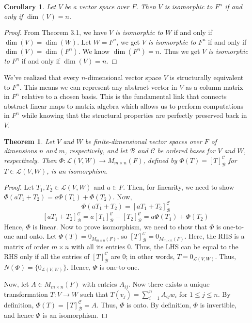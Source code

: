 \documentclass[12pt, a4paper]{article}
\newtheorem{theorem}{Theorem}[section]
\newtheorem{corollary}{Corollary}[theorem]
\theoremstyle{definition}
\theoremstyle{remark}
\newcommand{\B}{\mathscr{B}}
\begin{document}
\begin{corollary}
    Let $V$ be a vector space over $F$. Then $V$ \textit{is isomorphic to} $F^n$ if and only if $\dim(V) = n$.
\end{corollary}

\begin{proof}
    From Theorem 3.1, we have $V$ \textit{is isomorphic to} $W$ if and only if $\dim(V) = \dim(W)$. Let $W = F^n$, we get $V$ \textit{is isomorphic to} $F^n$ if and only if $\dim(V) = \dim(F^n)$. We know $\dim(F^n) = n$. Thus we get $V$ \textit{is isomorphic to} $F^n$ if and only if $\dim(V) = n$.
\end{proof}

We’ve realized that every $n$-dimensional vector space $V$ is structurally equivalent to $F^n$. This means we can represent any abstract vector in $V$ as a column matrix in $F^n$ relative to a chosen basis. This is the fundamental link that connects abstract linear maps to matrix algebra which allows us to perform computations in $F^n$ while knowing that the structural properties are perfectly preserved back in $V$.

\begin{theorem}
    Let $V$ and $W$ be finite-dimensional vector spaces over $F$ of dimensions $n$ and $m$, respectively, and let $\B$ and $\mathcal{C}$ be ordered bases for $V$ and $W$, respectively. Then $\Phi: \mathscr{L}(V, W) \to M_{m \times n}(F)$, defined by $\Phi(T) = [T]_\B^\mathscr{C}$ for $T \in \mathscr{L}(V, W)$, is an isomorphism.
\end{theorem}

\begin{proof}
    Let $T_1, T_2 \in \mathscr{L}(V, W)$ and $a \in F$. Then, for linearity, we need to show $\Phi(aT_1 + T_2) = a\Phi(T_1) + \Phi(T_2)$. Now,
\[ \Phi(aT_1 + T_2) = [aT_1 + T_2]_\B^\mathcal{C} \]
\[ [aT_1 + T_2]_\B^\mathcal{C} = a[T_1]_\B^\mathcal{C} + [T_2]_\B^\mathcal{C} = a\Phi(T_1) + \Phi(T_2) \]
Hence, $\Phi$ is linear. Now to prove isomorphism, we need to show that $\Phi$ is one-to-one and onto. Let $\Phi(T) = 0_{M_{m \times n}(F)}$, so $[T]_\B^\mathcal{C} = 0_{M_{m \times n}(F)}$. Here, the RHS is a matrix of order $m \times n$ with all its entries $0$. Thus, the LHS can be equal to the RHS only if all the entries of $[T]_\B^\mathcal{C}$ are $0$; in other words, $T = 0_{\mathscr{L}(V, W)}$. Thus, $N(\Phi) = \{0_{\mathscr{L}(V, W)}\}$. Hence, $\Phi$ is one-to-one.

Now, let $A \in M_{m \times n}(F)$ with entries $A_{ij}$. Now there exists a unique transformation $T: V \to W$ such that $T(v_j) = \sum_{i=1}^{n} A_{ij} w_i$ for $1 \leq j \leq n$. By definition, $\Phi(T) = [T]_\B^\mathcal{C} = A$. Thus, $\Phi$ is onto. By definition, $\Phi$ is invertible, and hence $\Phi$ is an isomorphism.
\end{proof}
\end{document}
